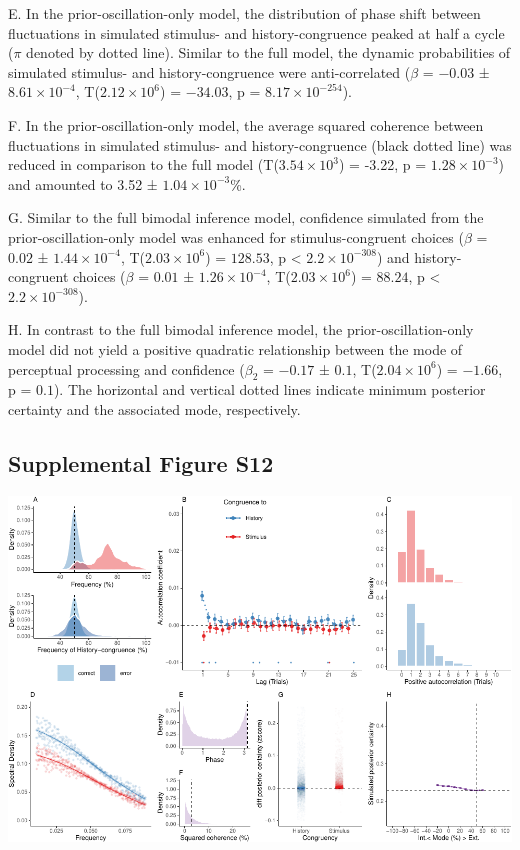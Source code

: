 \documentclass[
]{article}
\begin{document}
E. In the prior-oscillation-only model, the distribution of phase shift
between fluctuations in simulated stimulus- and history-congruence
peaked at half a cycle (\(\pi\) denoted by dotted line). Similar to the
full model, the dynamic probabilities of simulated stimulus- and
history-congruence were anti-correlated (\(\beta\) = \(-0.03\) ±
\(\ensuremath{8.61\times 10^{-4}}\),
T(\(\ensuremath{2.12\times 10^{6}}\)) = \(-34.03\), p =
\(\ensuremath{8.17\times 10^{-254}}\)).

F. In the prior-oscillation-only model, the average squared coherence
between fluctuations in simulated stimulus- and history-congruence
(black dotted line) was reduced in comparison to the full model
(T(\ensuremath{3.54\times 10^{3}}) = -3.22, p =
\(\ensuremath{1.28\times 10^{-3}}\)) and amounted to 3.52 ±
\ensuremath{1.04\times 10^{-3}}\%.

G. Similar to the full bimodal inference model, confidence simulated
from the prior-oscillation-only model was enhanced for
stimulus-congruent choices (\(\beta\) = \(0.02\) ±
\(\ensuremath{1.44\times 10^{-4}}\),
T(\(\ensuremath{2.03\times 10^{6}}\)) = \(128.53\), p < \(\ensuremath{2.2\times 10^{-308}}\)) and
history-congruent choices (\(\beta\) = \(0.01\) ±
\(\ensuremath{1.26\times 10^{-4}}\),
T(\(\ensuremath{2.03\times 10^{6}}\)) = \(88.24\), p < \(\ensuremath{2.2\times 10^{-308}}\)).

H. In contrast to the full bimodal inference model, the
prior-oscillation-only model did not yield a positive quadratic
relationship between the mode of perceptual processing and confidence
(\(\beta_2\) = \(-0.17\) ± \(0.1\),
T(\(\ensuremath{2.04\times 10^{6}}\)) = \(-1.66\), p = \(0.1\)). The
horizontal and vertical dotted lines indicate minimum posterior
certainty and the associated mode, respectively.

\newpage

\hypertarget{supplemental-figure-s12}{%
\subsection{Supplemental Figure S12}\label{supplemental-figure-s12}}

\includegraphics{modes_mouse_rev1b_clean_files/figure-latex/Supplemental_Figure_S12-1.pdf}
\end{document}
